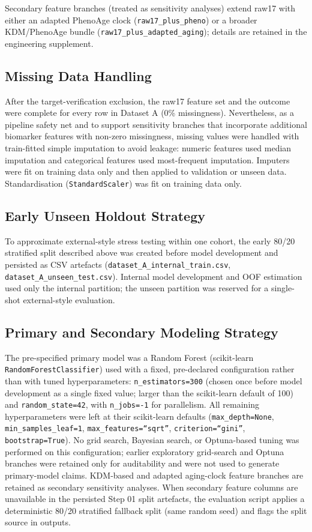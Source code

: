 \documentclass[11pt,a4paper]{article}
\begin{document}
Secondary feature branches (treated as sensitivity analyses) extend raw17 with either an adapted PhenoAge clock (\texttt{raw17\_plus\_pheno}) or a broader KDM/PhenoAge bundle (\texttt{raw17\_plus\_adapted\_aging}); details are retained in the engineering supplement.

\subsection{Missing Data Handling}
After the target-verification exclusion, the raw17 feature set and the outcome were complete for every row in Dataset A (0\% missingness). Nevertheless, as a pipeline safety net and to support sensitivity branches that incorporate additional biomarker features with non-zero missingness, missing values were handled with train-fitted simple imputation to avoid leakage: numeric features used median imputation and categorical features used most-frequent imputation. Imputers were fit on training data only and then applied to validation or unseen data. Standardisation (\texttt{StandardScaler}) was fit on training data only.

\subsection{Early Unseen Holdout Strategy}
To approximate external-style stress testing within one cohort, the early 80/20 stratified split described above was created before model development and persisted as CSV artefacts (\texttt{dataset\_A\_internal\_train.csv}, \texttt{dataset\_A\_unseen\_test.csv}). Internal model development and OOF estimation used only the internal partition; the unseen partition was reserved for a single-shot external-style evaluation.

\subsection{Primary and Secondary Modeling Strategy}
The pre-specified primary model was a Random Forest (scikit-learn \texttt{RandomForestClassifier}) used with a fixed, pre-declared configuration rather than with tuned hyperparameters: \texttt{n\_estimators=300} (chosen once before model development as a single fixed value; larger than the scikit-learn default of 100) and \texttt{random\_state=42}, with \texttt{n\_jobs=-1} for parallelism. All remaining hyperparameters were left at their scikit-learn defaults (\texttt{max\_depth=None}, \texttt{min\_samples\_leaf=1}, \texttt{max\_features=``sqrt''}, \texttt{criterion=``gini''}, \texttt{bootstrap=True}). No grid search, Bayesian search, or Optuna-based tuning was performed on this configuration; earlier exploratory grid-search and Optuna branches were retained only for auditability and were not used to generate primary-model claims. KDM-based and adapted aging-clock feature branches are retained as secondary sensitivity analyses. When secondary feature columns are unavailable in the persisted Step 01 split artefacts, the evaluation script applies a deterministic 80/20 stratified fallback split (same random seed) and flags the split source in outputs.
\end{document}
